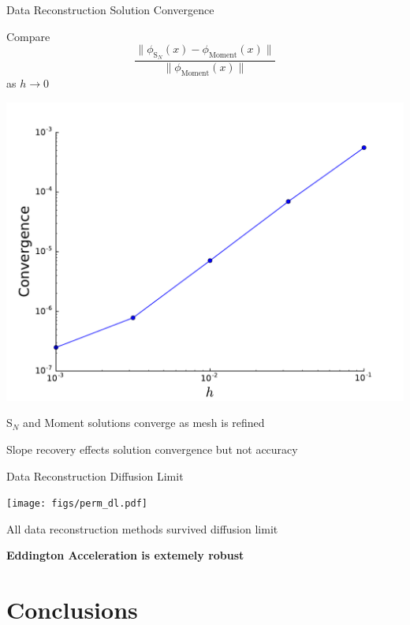 \documentclass[10pt,draft]{beamer}
\newcommand{\SN}{S$_N$\xspace}
\begin{document}
\begin{frame}{Data Reconstruction Solution Convergence}

	Compare 
	\begin{equation*}
		\frac{\| \phi_{\text{S}_N}(x) - 
			\phi_\text{Moment}(x)\|}{\|\phi_\text{Moment}(x) \|}
	\end{equation*}
	as $h\rightarrow 0$ 

	\pause
	\centerline{\includegraphics[width=.5\paperwidth]{figs/hlim.pdf}}

	\pause
	\SN and Moment solutions converge as mesh is refined 

	\pause Slope recovery effects solution convergence but not accuracy 

\end{frame}

\begin{frame}{Data Reconstruction Diffusion Limit}

	\centerline{\texttt{[image: figs/perm\_dl.pdf]}}

	\pause
	All data reconstruction methods survived diffusion limit

	\pause
	\vfill
	\centerline{\textbf{Eddington Acceleration is extemely robust}}

\end{frame}

\section{Conclusions}
\end{document}

